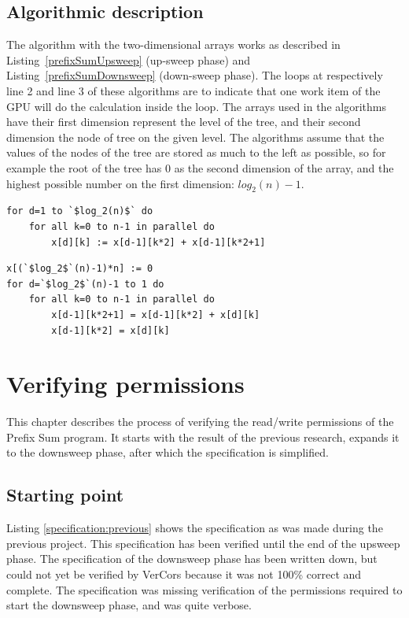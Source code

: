 \documentclass[a4paper]{article}
\begin{document}
\subsection{Algorithmic description} \label{sec:implAlgorithmic}
The algorithm with the two-dimensional arrays works as described in Listing~\ref{prefixSumUpsweep} (up-sweep phase) and Listing~\ref{prefixSumDownsweep} (down-sweep phase). The loops at respectively line 2 and line 3 of these algorithms are to indicate that one work item of the GPU will do the calculation inside the loop. The arrays used in the algorithms have their first dimension represent the level of the tree, and their second dimension the node of tree on the given level. The algorithms assume that the values of the nodes of the tree are stored as much to the left as possible, so for example the root of the tree has 0 as the second dimension of the array, and the highest possible number on the first dimension: $log_2(n)-1$.

\begin{lstlisting}[caption=Upsweep phase, label=prefixSumUpsweep, float=htpb]
for d=1 to `$log_2(n)$` do
	for all k=0 to n-1 in parallel do 
		x[d][k] := x[d-1][k*2] + x[d-1][k*2+1]
\end{lstlisting}

\begin{lstlisting}[caption=Downsweep phase, label=prefixSumDownsweep, float=htpb]
x[(`$log_2$`(n)-1)*n] := 0
for d=`$log_2$`(n)-1 to 1 do
	for all k=0 to n-1 in parallel do
		x[d-1][k*2+1] = x[d-1][k*2] + x[d][k]
		x[d-1][k*2] = x[d][k]
\end{lstlisting}
\FloatBarrier


\section{Verifying permissions}\label{chapter:verifyingPermissions}
This chapter describes the process of verifying the read/write permissions of the Prefix Sum program. It starts with the result of the previous research, expands it to the downsweep phase, after which the specification is simplified.

\subsection{Starting point}
Listing \ref{specification:previous} shows the specification as was made during the previous project. This specification has been verified until the end of the upsweep phase. The specification of the downsweep phase has been written down, but could not yet be verified by VerCors because it was not 100\% correct and complete. The specification was missing verification of the permissions required to start the downsweep phase, and was quite verbose.
\end{document}
